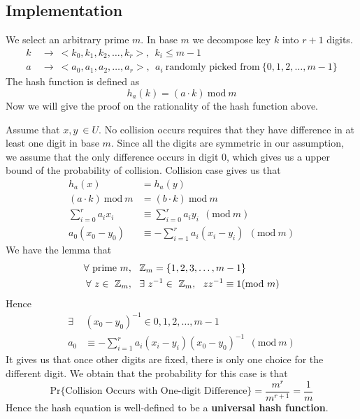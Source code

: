 \documentclass[15pt]{article}
\begin{document}
\subsection{Implementation}
We select an arbitrary prime $m$. In base $m$ we decompose key $k$ into $r+1$ digits.
\begin{equation}
\begin{aligned}
    k~&\rightarrow~<k_0, k_1, k_2, \dots , k_r>,~~k_i \leq m-1 \\
    a~&\rightarrow~<a_0, a_1, a_2, \dots, a_r>,~~a_i~\text{randomly picked from}~\{ 0, 1, 2, \dots, m-1 \}
\end{aligned}
\end{equation}
The hash function is defined as
\begin{equation}
    h_a(k) = ( a \cdot k )~\text{mod}~m
\end{equation}
Now we will give the proof on the rationality of the hash function above. \par
Assume that $x, y~ \in U$. No collision occurs requires that they have difference in at least one digit in base $m$. Since all the digits are symmetric in our assumption, we assume that the only difference occurs in digit 0, which gives us a upper bound of the probability of collision.
Collision case gives us that
\begin{equation}
\begin{aligned}
    h_a(x) &= h_a(y) \\
    ( a\cdot k )~\text{mod}~m &= (b \cdot k )~\text{mod}~m \\
    \sum_{i=0}^r a_i x_i &\equiv \sum_{i=0}^r a_iy_i~~(\text{mod}~m) \\
    a_0(x_0 - y_0) &\equiv -\sum_{i=1}^r a_i(x_i -y_i)~~(\text{mod}~m) 
\end{aligned}
\end{equation}
We have the lemma that
\begin{equation}
\begin{aligned}
    \forall~\text{prime}~m&,~~\mathbb{Z}_m = \{1, 2, 3, \dots, m-1\} \\
    \forall~z\in~\mathbb{Z}_m&,~~\exists~z^{-1}\in~\mathbb{Z}_m,~~zz^{-1} \equiv 1(\text{mod}~m) \notag
\end{aligned}
\end{equation}
Hence
\begin{equation}
\begin{aligned}
    \exists~&(x_0 - y_0)^{-1} \in {0, 1, 2,\dots, m-1} \\
    a_0 &\equiv -\sum_{i=1}^r a_i(x_i-y_i) (x_0-y_0)^{-1}~~(\text{mod}~m)
\end{aligned}
\end{equation}
It gives us that once other digits are fixed, there is only one choice for the different digit. We obtain that the probability for this case is that
\begin{equation}
    \text{Pr} \{\text{Collision Occurs with One-digit Difference} \} = \frac{m^r}{m^{r+1}} = \frac{1}{m}
\end{equation}
Hence the hash equation is well-defined to be a \textbf{universal hash function}.
\clearpage
\end{document}
